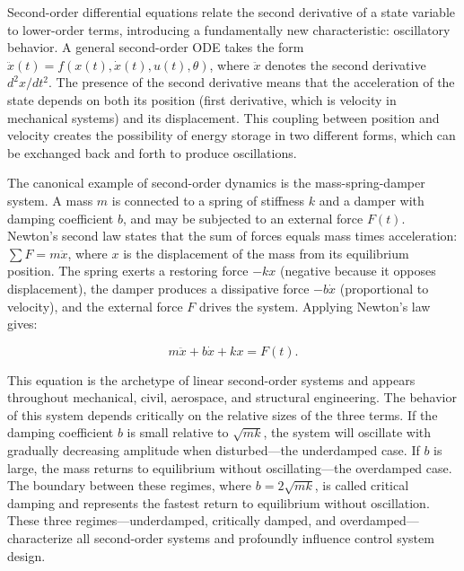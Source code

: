 Second-order differential equations relate the second derivative of a state variable to lower-order terms, introducing a fundamentally new characteristic: oscillatory behavior. A general second-order ODE takes the form $\ddot{x}(t) = f(x(t), \dot{x}(t), u(t), \theta)$, where $\ddot{x}$ denotes the second derivative $d^2x/dt^2$. The presence of the second derivative means that the acceleration of the state depends on both its position (first derivative, which is velocity in mechanical systems) and its displacement. This coupling between position and velocity creates the possibility of energy storage in two different forms, which can be exchanged back and forth to produce oscillations.

The canonical example of second-order dynamics is the mass-spring-damper system. A mass $m$ is connected to a spring of stiffness $k$ and a damper with damping coefficient $b$, and may be subjected to an external force $F(t)$. Newton's second law states that the sum of forces equals mass times acceleration: $\sum F = m \ddot{x}$, where $x$ is the displacement of the mass from its equilibrium position. The spring exerts a restoring force $-k x$ (negative because it opposes displacement), the damper produces a dissipative force $-b \dot{x}$ (proportional to velocity), and the external force $F$ drives the system. Applying Newton's law gives:

\begin{equation}
m \ddot{x} + b \dot{x} + k x = F(t).
\end{equation}

This equation is the archetype of linear second-order systems and appears throughout mechanical, civil, aerospace, and structural engineering. The behavior of this system depends critically on the relative sizes of the three terms. If the damping coefficient $b$ is small relative to $\sqrt{mk}$, the system will oscillate with gradually decreasing amplitude when disturbed—the underdamped case. If $b$ is large, the mass returns to equilibrium without oscillating—the overdamped case. The boundary between these regimes, where $b = 2\sqrt{mk}$, is called critical damping and represents the fastest return to equilibrium without oscillation. These three regimes—underdamped, critically damped, and overdamped—characterize all second-order systems and profoundly influence control system design.

